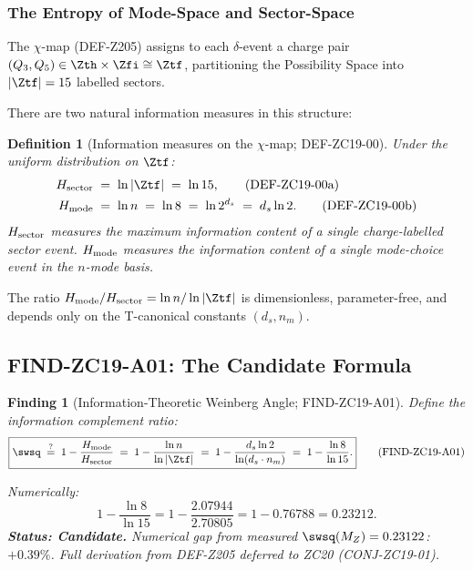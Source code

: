 \documentclass[12pt, a4paper]{article}
\newtheorem{definition}{Definition}[section]
\newtheorem{finding}{Finding}[section]
\begin{document}
\subsubsection{The Entropy of Mode-Space and Sector-Space}

The $\chi$-map (DEF-Z205) assigns to each $\delta$-event a charge pair
$(Q_3, Q_5)\in\Zth\times\Zfi\cong\Ztf$, partitioning the Possibility
Space into $|\Ztf| = 15$ labelled sectors.

There are two natural information measures in this structure:

\begin{definition}[Information measures on the $\chi$-map; DEF-ZC19-00]
\label{zc19:def:info-measures}
Under the uniform distribution on $\Ztf$:
\begin{align}
  H_{\rm sector} &\;=\; \ln|\Ztf| \;=\; \ln 15,
  \tag{DEF-ZC19-00a}\\
  H_{\rm mode} &\;=\; \ln n \;=\; \ln 8 \;=\; \ln 2^{d_s} \;=\; d_s\ln 2.
  \tag{DEF-ZC19-00b}
\end{align}
$H_{\rm sector}$ measures the maximum information content of a single
charge-labelled sector event.
$H_{\rm mode}$ measures the information content of a single mode-choice
event in the $n$-mode basis.
\end{definition}

The ratio $H_{\rm mode}/H_{\rm sector} = \ln n/\ln|\Ztf|$ is
dimensionless, parameter-free, and depends only on the T-canonical
constants $(d_s, n_m)$.

\subsection{FIND-ZC19-A01: The Candidate Formula}
\label{zc19:sec:candidate}

\begin{finding}[Information-Theoretic Weinberg Angle; FIND-ZC19-A01]
\label{zc19:find:main}
Define the \emph{information complement ratio}:
\begin{equation}
  \boxed{%
    \swsq \;\stackrel{?}{=}\;
    1 - \frac{H_{\rm mode}}{H_{\rm sector}}
    \;=\; 1 - \frac{\ln n}{\ln|\Ztf|}
    \;=\; 1 - \frac{d_s\ln 2}{\ln(d_s\cdot n_m)}
    \;=\; 1 - \frac{\ln 8}{\ln 15}.
  }
  \tag{FIND-ZC19-A01}
\end{equation}

Numerically:
\[
  1 - \frac{\ln 8}{\ln 15}
  = 1 - \frac{2.07944}{2.70805}
  = 1 - 0.76788
  = 0.23212.
\]
\textbf{Status: Candidate.}
Numerical gap from measured $\swsq(M_Z) = 0.23122$: $\mathbf{+0.39\%}$.
Full derivation from DEF-Z205 deferred to ZC20 (CONJ-ZC19-01).
\end{finding}
\end{document}
